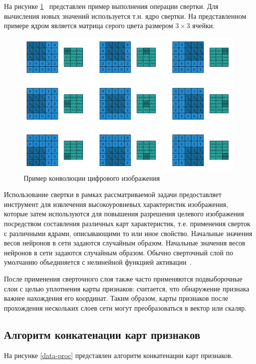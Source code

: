 На рисунке \ref{conv}~\cite{conv} представлен пример выполнения операции свертки. Для вычисления новых значений используется т.н. ядро свертки. На представленном примере ядром является матрица серого цвета размером $3\times3$ ячейки.

\begin{figure}[H]
    \centering
    \includegraphics[scale=1.4]{assets/convolution_example}
    \caption{Пример конволюции цифрового изображения}
    \label{conv}
\end{figure}

Использование свертки в рамках рассматриваемой задачи предоставляет инструмент для извлечения высокоуровневых характеристик изображения, которые затем используются для повышения разрешения целевого изображения посредством составления различных карт характеристик, т.е. применения сверток с различными ядрами, описывающими то или иное свойство. Начальные значения весов нейронов в сети задаются случайным образом. Начальные значения весов нейронов в сети задаются случайным образом. Обычно сверточный слой по умолчанию объединяется с нелинейной функцией активации~\cite{layers}.

После применения сверточного слоя также часто применяются подвыборочные слои с целью уплотнения карты признаков: считается, что обнаружение признака важнее нахождения его координат. Таким образом, карты признаков после прохождения нескольких слоев сети могут преобразоваться в вектор или скаляр.

\subsection{Алгоритм конкатенации карт признаков}

На рисунке \ref{data-proc} представлен алгоритм конкатенации карт признаков.

